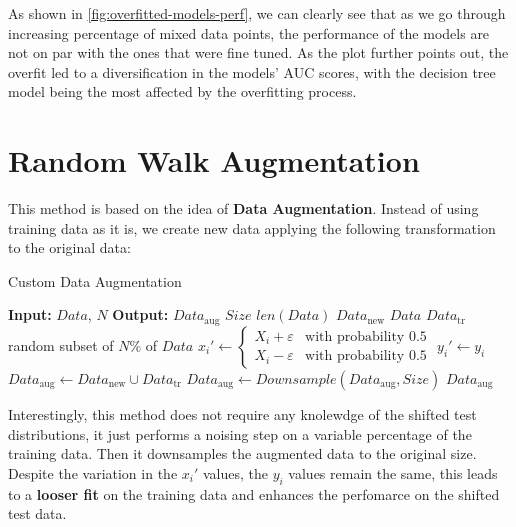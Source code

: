 As shown in \cref{fig:overfitted-models-perf}, we can clearly see that as we go through increasing percentage of mixed data points, the performance of the models are not on par with the ones that were fine tuned. As the plot further points out, the overfit led to a diversification in the models' AUC scores, with the decision tree model being the most affected by the overfitting process. 

\section{Random Walk Augmentation}

This method is based on the idea of \textbf{Data Augmentation}. Instead of using training data as it is, we create new data applying the following transformation to the original data:

\begin{algorithm}[H]
    \caption{Custom Data Augmentation}
    \begin{algorithmic}[1]
        \Statex \textbf{Input:} $Data$, $N$
        \Statex \textbf{Output:} $Data_\text{aug}$
        \Statex
        \State $Size$ \leftarrow $len(Data)$ 
        \State $Data_\text{new}$ \leftarrow $Data$
        \State $Data_\text{tr}$ \leftarrow random subset of $N\%$ of $Data$
            \State $x_i' \leftarrow 
            \begin{cases}
                X_i + \varepsilon & \text{with probability } 0.5 \\
                X_i - \varepsilon & \text{with probability } 0.5
            \end{cases}$
            \State $y_i' \leftarrow y_i$
        \EndFor
        \State $Data_\text{aug} \leftarrow Data_\text{new} \cup Data_\text{tr}$
        \State $Data_\text{aug} \leftarrow Downsample(Data_\text{aug}, Size)$
        \State\Return $Data_\text{aug}$
    \end{algorithmic}
\end{algorithm}

Interestingly, this method does not require any knolewdge of the shifted test distributions, it just performs a noising step on a variable percentage of the training data. Then it downsamples the augmented data to the original size.
Despite the variation in the $x_i'$ values, the $y_i$ values remain the same, this leads to a \textbf{looser fit} on the training data and enhances the perfomarce on the shifted test data.

